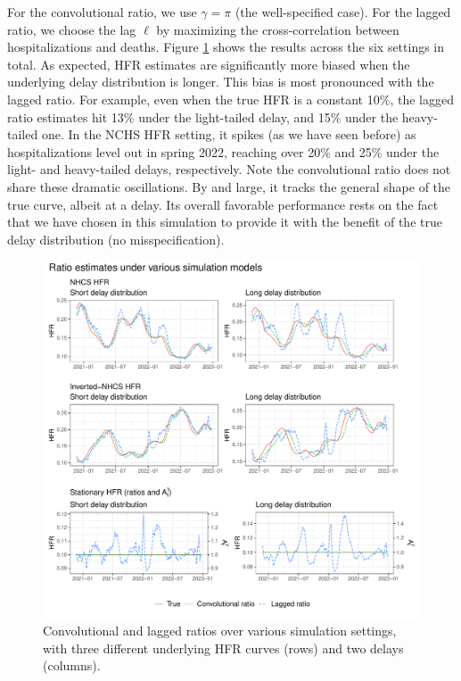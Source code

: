 \documentclass{article}
\begin{document}
For the convolutional ratio, we use $\gamma = \pi$ (the well-specified case). 
For the lagged ratio, we choose the lag $\ell$ by maximizing the
cross-correlation between hospitalizations and deaths. 
Figure \ref{fig:sims} shows the results across the six settings in total. As
expected, HFR estimates are significantly more biased when the underlying delay
distribution is longer. This bias is most pronounced with the lagged ratio. For
example, even when the true HFR is a constant 10\%, the lagged ratio estimates
hit 13\% under the light-tailed delay, and 15\% under the heavy-tailed one. In
the NCHS HFR setting, it spikes (as we have seen before) as hospitalizations
level out in spring 2022, reaching over 20\% and 25\% under the light- and 
heavy-tailed delays, respectively. Note the convolutional ratio does not share
these dramatic oscillations. By and large, it tracks the general shape of the
true curve, albeit at a delay.
Its overall favorable performance rests on the fact that we have chosen in this
simulation to provide it with the benefit of the true delay distribution (no
misspecification).   

\begin{figure}[t!]
\centering
\includegraphics[width=\linewidth]{Figures/Simulated/simulated_results_corr_lag.pdf}
\caption{Convolutional and lagged ratios over various simulation settings, with
  three different underlying HFR curves (rows) and two delays (columns).}
\label{fig:sims}
\end{figure}
\end{document}
